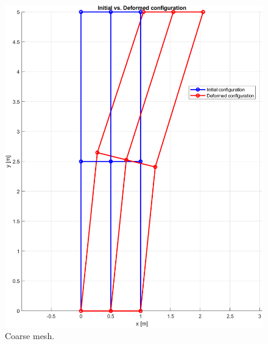 \begin{figure}[H]
    \centering

    \begin{minipage}[b]{0.45\textwidth}
        \centering
        \includegraphics[width=\textwidth]{img/mesh_coarse.png}
        \caption{Coarse mesh.}
    \end{minipage}
    \hfill
    \begin{minipage}[b]{0.45\textwidth}
        \centering

\end{minipage}
\end{figure}
